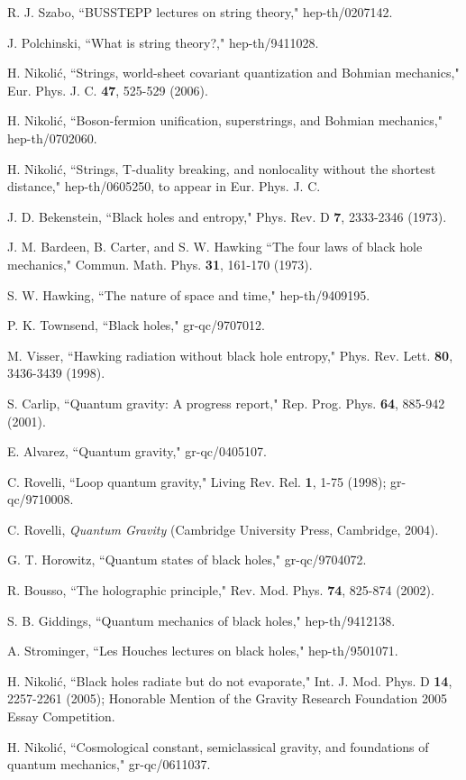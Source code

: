 \documentclass[12pt]{article}
\begin{document}
\begin{thebibliography}{99}
R. J. Szabo,
``BUSSTEPP lectures on string theory,"
hep-th/0207142.

J. Polchinski,
``What is string theory?,"
hep-th/9411028.

H. Nikoli\'c,
``Strings, world-sheet covariant quantization and Bohmian mechanics,"
Eur. Phys. J. C. {\bf 47}, 525-529 (2006).

H. Nikoli\'c, 
``Boson-fermion unification, superstrings, and Bohmian mechanics,"
hep-th/0702060.


H. Nikoli\'c,
``Strings, T-duality breaking, and nonlocality without the shortest
distance,"
hep-th/0605250, to appear in Eur. Phys. J. C.

J. D. Bekenstein,
``Black holes and entropy,"
Phys. Rev. D {\bf 7}, 2333-2346 (1973).

J. M. Bardeen, B. Carter, and S. W. Hawking
``The four laws of black hole mechanics,"
Commun. Math. Phys. {\bf 31}, 161-170 (1973).

S. W. Hawking,
``The nature of space and time,"
hep-th/9409195.

P. K. Townsend,
``Black holes,"
gr-qc/9707012.

M. Visser,
``Hawking radiation without black hole entropy,"
Phys. Rev. Lett. {\bf 80}, 3436-3439 (1998).

S. Carlip,
``Quantum gravity: A progress report,"
Rep. Prog. Phys. {\bf 64}, 885-942 (2001).

E. Alvarez,
``Quantum gravity,"
gr-qc/0405107.

C. Rovelli,
``Loop quantum gravity,"
Living Rev. Rel. {\bf 1}, 1-75 (1998); gr-qc/9710008.

C. Rovelli, {\it Quantum Gravity}
(Cambridge University Press, Cambridge, 2004).


G. T. Horowitz,
``Quantum states of black holes,"
gr-qc/9704072.

R. Bousso,
``The holographic principle,"
Rev. Mod. Phys. {\bf 74}, 825-874 (2002).

S. B. Giddings,
``Quantum mechanics of black holes,"
hep-th/9412138.

A. Strominger,
``Les Houches lectures on black holes,"
hep-th/9501071.

H. Nikoli\'c,
``Black holes radiate but do not evaporate,"
Int. J. Mod. Phys. D {\bf 14}, 2257-2261 (2005);
Honorable Mention of the Gravity Research Foundation 2005 Essay Competition.

H. Nikoli\'c,
``Cosmological constant, semiclassical gravity, and foundations
of quantum mechanics,"
gr-qc/0611037.



\end{thebibliography}
\end{document}

